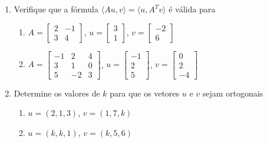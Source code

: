 \documentclass[a4paper,5pt]{amsbook}
\begin{document}
\begin{enumerate}
    \vspace{0.5cm}
    \item Verifique que a f\'ormula $\langle Au,v\rangle=\langle u,A^Tv\rangle$ \'e v\'alida para 
        \begin{enumerate}
            \item $A=\left[\begin{array}{ccc}
                    2 & -1 \\
                    3 & 4
                \end{array}\right]$,
                $u=\left[\begin{array}{cc}
                    3 \\
                    1
                \end{array}\right]$,
                $v=\left[\begin{array}{cc}
                    -2 \\
                    6
                \end{array}\right]$
            \item $A=\left[\begin{array}{ccc}
                    -1 & 2 & 4 \\
                    3 & 1 & 0 \\
                    5 & -2 & 3
                \end{array}\right]$,
                $u=\left[\begin{array}{cc}
                    -1 \\
                    2 \\
                    5
                \end{array}\right]$,
                $v=\left[\begin{array}{cc}
                    0 \\
                    2 \\
                    -4
                \end{array}\right]$
        \end{enumerate}

    \vspace{0.5cm}
    \item Determine os valores de $k$ para que os vetores $u$ e $v$ sejam
        ortogonais
        \begin{enumerate}
            \item $u=(2,1,3)$, $v=(1,7,k)$
            \item $u=(k,k,1)$, $v=(k,5,6)$
        \end{enumerate}


\end{enumerate}
\end{document}
